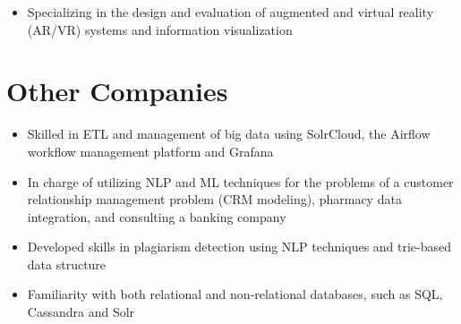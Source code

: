 \documentclass[10pt,a4paper]{altacv}
\begin{document}
\begin{itemize}
	\item Specializing in the design and evaluation of augmented and virtual reality (AR/VR) systems and information visualization
\end{itemize}

\divider

\section*{Other Companies}

\begin{itemize}
	\item Skilled in ETL and management of big data using SolrCloud, the Airflow workflow management platform and Grafana
	      
	      
\end{itemize}

\divider



\begin{itemize}
	\item In charge of utilizing NLP and ML techniques for the problems of a customer relationship management problem (CRM modeling), pharmacy data integration, and consulting a banking company
\end{itemize}

\divider
%




\begin{itemize}
	\item Developed skills in plagiarism detection using NLP techniques and trie-based data structure
	\item Familiarity with both relational and non-relational databases, such as SQL, Cassandra and Solr
	      
\end{itemize}
\end{document}
